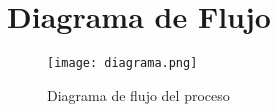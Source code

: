 \documentclass{article}
\begin{document}
\section{Diagrama de Flujo}
\begin{figure}
    \centering
    \texttt{[image: diagrama.png]}
    \caption{Diagrama de flujo del proceso}
\end{figure}
\end{document}
